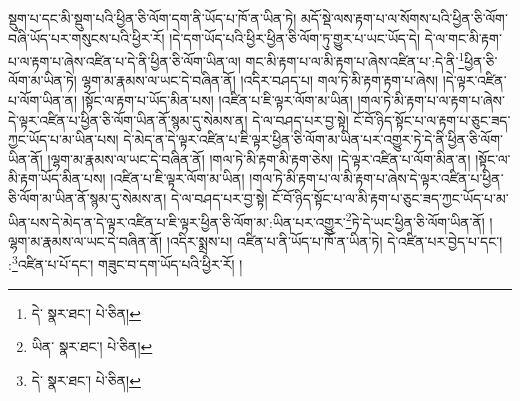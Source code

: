 སྡུག་པ་དང་མི་སྡུག་པའི་ཕྱིན་ཅི་ལོག་དག་ནི་ཡོད་པ་ཁོ་ན་ཡིན་ཏེ། མདོ་སྡེ་ལས་རྟག་པ་ལ་སོགས་པའི་ཕྱིན་ཅི་ལོག་བཞི་ཡོད་པར་གསུངས་པའི་ཕྱིར་རོ། །དེ་དག་ཡོད་པའི་ཕྱིར་ཕྱིན་ཅི་ལོག་ཏུ་གྱུར་པ་ཡང་ཡོད་དེ། དེ་ལ་གང་མི་རྟག་པ་ལ་རྟག་པ་ཞེས་འཛིན་པ་དེ་ནི་ཕྱིན་ཅི་ལོག་ཡིན་ལ། གང་མི་རྟག་པ་ལ་མི་རྟག་པ་ཞེས་འཛིན་པ་:དེ་ནི་\footnote{དེ་  སྣར་ཐང་།  པེ་ཅིན། }ཕྱིན་ཅི་ལོག་མ་ཡིན་ཏེ། ལྷག་མ་རྣམས་ལ་ཡང་དེ་བཞིན་ནོ། །འདིར་བཤད་པ། གལ་ཏེ་མི་རྟག་རྟག་པ་ཞེས། །དེ་ལྟར་འཛིན་པ་ལོག་ཡིན་ན། །སྟོང་ལ་རྟག་པ་ཡོད་མིན་པས། །འཛིན་པ་ཇི་ལྟར་ལོག་མ་ཡིན། །གལ་ཏེ་མི་རྟག་པ་ལ་རྟག་པ་ཞེས་དེ་ལྟར་འཛིན་པ་ཕྱིན་ཅི་ལོག་ཡིན་ནོ་སྙམ་དུ་སེམས་ན། དེ་ལ་བཤད་པར་བྱ་སྟེ། ངོ་བོ་ཉིད་སྟོང་པ་ལ་རྟག་པ་ཅུང་ཟད་ཀྱང་ཡོད་པ་མ་ཡིན་པས། དེ་མེད་ན་དེ་ལྟར་འཛིན་པ་ཇི་ལྟར་ཕྱིན་ཅི་ལོག་མ་ཡིན་པར་འགྱུར་ཏེ་དེ་ནི་ཕྱིན་ཅི་ལོག་ཡིན་ནོ། །ལྷག་མ་རྣམས་ལ་ཡང་དེ་བཞིན་ནོ། །གལ་ཏེ་མི་རྟག་མི་རྟག་ཅེས། །དེ་ལྟར་འཛིན་པ་ལོག་མིན་ན། །སྟོང་ལ་མི་རྟག་ཡོད་མིན་པས། །འཛིན་པ་ཇི་ལྟར་ལོག་མ་ཡིན། །གལ་ཏེ་མི་རྟག་པ་ལ་མི་རྟག་པ་ཞེས་དེ་ལྟར་འཛིན་པ་ཕྱིན་ཅི་ལོག་མ་ཡིན་ནོ་སྙམ་དུ་སེམས་ན། དེ་ལ་བཤད་པར་བྱ་སྟེ། ངོ་བོ་ཉིད་སྟོང་པ་ལ་མི་རྟག་པ་ཅུང་ཟད་ཀྱང་ཡོད་པ་མ་ཡིན་པས་དེ་མེད་ན་དེ་ལྟར་འཛིན་པ་ཇི་ལྟར་ཕྱིན་ཅི་ལོག་མ་:ཡིན་པར་འགྱུར་\footnote{ཡིན་  སྣར་ཐང་།  པེ་ཅིན། }ཏེ་དེ་ཡང་ཕྱིན་ཅི་ལོག་ཡིན་ནོ། །ལྷག་མ་རྣམས་ལ་ཡང་དེ་བཞིན་ནོ། །འདིར་སྨྲས་པ། འཛིན་པ་ནི་ཡོད་པ་ཁོ་ན་ཡིན་ཏེ། དེ་འཛིན་པར་བྱེད་པ་དང་། :\footnote{དེ་  སྣར་ཐང་།  པེ་ཅིན། }འཛིན་པ་པོ་དང་། གཟུང་བ་དག་ཡོད་པའི་ཕྱིར་རོ། །
